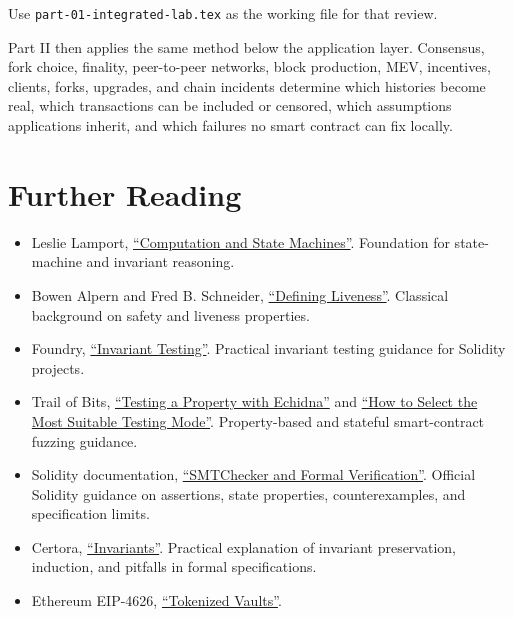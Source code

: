 Use \passthrough{\lstinline!part-01-integrated-lab.tex!} as the working file for that review.

Part II then applies the same method below the application layer. Consensus, fork choice, finality, peer-to-peer networks, block production, MEV, incentives, clients, forks, upgrades, and chain incidents determine which histories become real, which transactions can be included or censored, which assumptions applications inherit, and which failures no smart contract can fix locally.

\section{Further Reading}

\begin{itemize}
\tightlist
\item
  Leslie Lamport,
  \href{https://lamport.azurewebsites.net/pubs/state-machine.pdf}{``Computation
  and State Machines''}. Foundation for state-machine and invariant
  reasoning.
\item
  Bowen Alpern and Fred B. Schneider,
  \href{https://www.cs.cornell.edu/fbs/publications/DefLiveness.pdf}{``Defining
  Liveness''}. Classical background on safety and liveness properties.
\item
  Foundry,
  \href{https://www.getfoundry.sh/guides/invariant-testing}{``Invariant
  Testing''}. Practical invariant testing guidance for Solidity
  projects.
\item
  Trail of Bits,
  \href{https://secure-contracts.com/program-analysis/echidna/introduction/how-to-test-a-property.html}{``Testing
  a Property with Echidna''} and
  \href{https://secure-contracts.com/program-analysis/echidna/basic/testing-modes.html}{``How
  to Select the Most Suitable Testing Mode''}. Property-based and
  stateful smart-contract fuzzing guidance.
\item
  Solidity documentation,
  \href{https://docs.soliditylang.org/en/latest/smtchecker.html}{``SMTChecker
  and Formal Verification''}. Official Solidity guidance on assertions,
  state properties, counterexamples, and specification limits.
\item
  Certora,
  \href{https://docs.certora.com/en/latest/docs/cvl/invariants.html}{``Invariants''}.
  Practical explanation of invariant preservation, induction, and
  pitfalls in formal specifications.
\item
  Ethereum EIP-4626,
  \href{https://eips.ethereum.org/EIPS/eip-4626}{``Tokenized Vaults''}.

\end{itemize}
